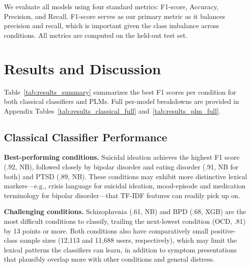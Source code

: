 \documentclass[11pt]{article}
\begin{document}
We evaluate all models using four standard metrics: F1-score, Accuracy, Precision, and Recall. F1-score serves as our primary metric as it balances precision and recall, which is important given the class imbalance across conditions. All metrics are computed on the held-out test set.



%

\section{Results and Discussion}
\label{sec:results}

Table~\ref{tab:results_summary} summarizes the best F1 scores per condition for both classical classifiers and PLMs. Full per-model breakdowns are provided in Appendix Tables~\ref{tab:results_classical_full} and~\ref{tab:results_plm_full}.

% 

\subsection{Classical Classifier Performance}

\textbf{Best-performing conditions.} Suicidal ideation achieves the highest F1 score (.92, NB), followed closely by bipolar disorder and eating disorder (.91, NB for both) and PTSD (.89, NB). These conditions may exhibit more distinctive lexical markers---e.g., crisis language for suicidal ideation, mood-episode and medication terminology for bipolar disorder---that TF-IDF features can readily pick up on.

\textbf{Challenging conditions.} Schizophrenia (.61, NB) and BPD (.68, XGB) are the most difficult conditions to classify, trailing the next-lowest condition (OCD, .81) by 13 points or more. Both conditions also have comparatively small positive-class sample sizes (12,113 and 11,688 users, respectively), which may limit the lexical patterns the classifiers can learn, in addition to symptom presentations that plausibly overlap more with other conditions and general distress.
\end{document}

